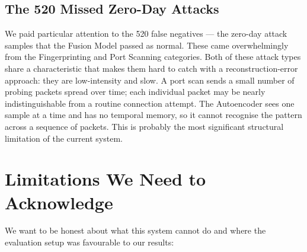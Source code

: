\documentclass[12pt,a4paper]{report}
\begin{document}
\subsection{The 520 Missed Zero-Day Attacks}

We paid particular attention to the 520 false negatives --- the zero-day attack
samples that the Fusion Model passed as normal. These came overwhelmingly from
the Fingerprinting and Port Scanning categories. Both of these attack types share
a characteristic that makes them hard to catch with a reconstruction-error
approach: they are low-intensity and slow. A port scan sends a small number of
probing packets spread over time; each individual packet may be nearly
indistinguishable from a routine connection attempt. The Autoencoder sees one
sample at a time and has no temporal memory, so it cannot recognise the pattern
across a sequence of packets. This is probably the most significant structural
limitation of the current system.

\section{Limitations We Need to Acknowledge}

We want to be honest about what this system cannot do and where the evaluation
setup was favourable to our results:
\end{document}
